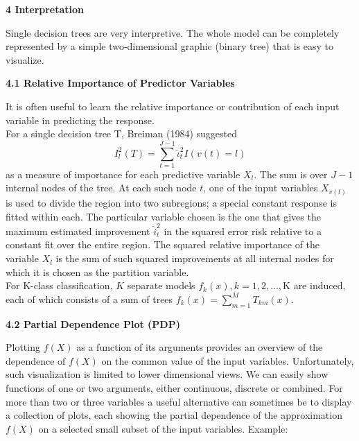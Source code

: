 \documentclass[12pt, letterpaper, twoside]{article}
\begin{document}
\begin{center}
\textbf{\large{4 Interpretation}}
\end{center}
\hspace*{4ex}Single decision trees are very interpretive. The whole model can be completely represented by a simple two-dimensional graphic (binary tree) that is easy to visualize.
\begin{center}
\textbf{\large{4.1 Relative Importance of Predictor Variables}}
\end{center}
\hspace*{4ex} It is often useful to learn the relative importance or contribution of each input variable in predicting the response.\\
\hspace*{4ex}For a single decision tree T, Breiman (1984) suggested
\begin{equation*}
I_l^2(T)=\sum_{t=1}^{J-1} \hat{\iota}_t^2 I(v(t)=l)
\end{equation*}
as a measure of importance for each predictive variable $X_l$. The sum is over $J-1$ internal nodes of the tree. At each such node $t$, one of the input variables $X_{v(t)}$ is used to divide the region into two subregions; a special constant response is fitted within each. The particular variable chosen is the one that gives the maximum estimated improvement $\hat{i}_t^2$ in the squared error risk relative to a constant fit over the entire region. The squared relative importance of the variable $X_l$ is the sum of such squared improvements at all internal nodes for which it is chosen as the partition variable.\\
\hspace*{4ex} For K-class classification, $K$ separate models $f_k(x),k=1,2,...,$K are induced, each of which consists of a sum of trees $f_k(x)=\sum_{m=1}^M T_{km}(x)$.\\
\begin{center}
\textbf{\large{4.2 Partial Dependence Plot (PDP)}}
\end{center}
\hspace*{4ex}Plotting $f(X)$ as a function of its arguments provides an overview of the dependence of $f(X)$ on the common value of the input variables. Unfortunately, such visualization is limited to lower dimensional views. We can easily show functions of one or two arguments, either continuous, discrete or combined. For more than two or three variables a useful alternative can sometimes be to display a collection of plots, each showing the partial dependence of the approximation $f(X)$ on a selected small subset of the input variables. Example:
\end{document}
